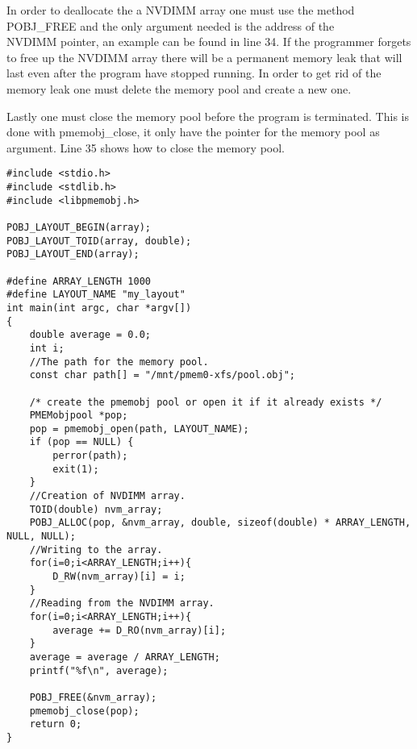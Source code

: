 \documentclass[12pt,a4paper,USenglish]{article}      %
\begin{document}
In order to deallocate the a NVDIMM array one must use the method POBJ\_FREE and the only argument needed is the address of the \\NVDIMM pointer, an example can be found in line 34. If the programmer forgets to free up the NVDIMM array there will be a permanent memory leak that will last even after the program have stopped running. In order to get rid of the memory leak one must delete the memory pool and create a new one.

Lastly one must close the memory pool before the program is terminated. This is done with pmemobj\_close, it only have the pointer for the memory pool as argument. Line 35 shows how to close the memory pool.

\begin{lstlisting}[caption={Example of coding with NVDIMM}, label={nvdimm_example}]
#include <stdio.h>
#include <stdlib.h>
#include <libpmemobj.h>

POBJ_LAYOUT_BEGIN(array);
POBJ_LAYOUT_TOID(array, double);
POBJ_LAYOUT_END(array);

#define ARRAY_LENGTH 1000
#define LAYOUT_NAME "my_layout"
int main(int argc, char *argv[])
{
	double average = 0.0;
	int i;
	//The path for the memory pool.
	const char path[] = "/mnt/pmem0-xfs/pool.obj";
	
	/* create the pmemobj pool or open it if it already exists */
	PMEMobjpool *pop;
	pop = pmemobj_open(path, LAYOUT_NAME);
	if (pop == NULL) {
		perror(path);
		exit(1);
	}
	//Creation of NVDIMM array.
	TOID(double) nvm_array;
	POBJ_ALLOC(pop, &nvm_array, double, sizeof(double) * ARRAY_LENGTH, NULL, NULL);
	//Writing to the array.
	for(i=0;i<ARRAY_LENGTH;i++){
		D_RW(nvm_array)[i] = i;
	}
	//Reading from the NVDIMM array.
	for(i=0;i<ARRAY_LENGTH;i++){
		average += D_RO(nvm_array)[i];
	}
	average = average / ARRAY_LENGTH;
	printf("%f\n", average);
	
	POBJ_FREE(&nvm_array);
	pmemobj_close(pop);
	return 0;
}
\end{lstlisting}
\end{document}
